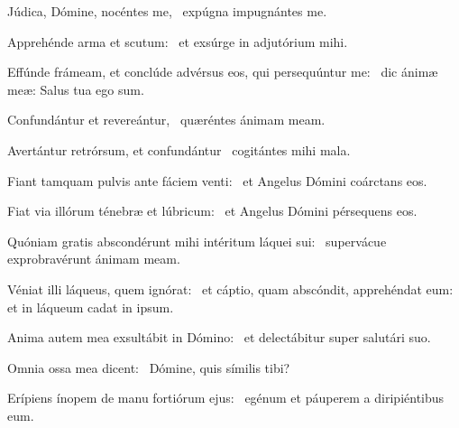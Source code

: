 \item Júdica, Dómine, nocéntes me,~\psstar{} expúgna impugnántes me.

\item Apprehénde arma et scutum:~\psstar{} et exsúrge in adjutórium mihi.

\item Effúnde frámeam, et conclúde advérsus eos, qui persequúntur me:~\psstar{} dic ánimæ meæ: Salus tua ego sum.

\item Confundántur et revereántur,~\psstar{} quæréntes ánimam meam.

\item Avertántur retrórsum, et confundántur~\psstar{} cogitántes mihi mala.

\item Fiant tamquam pulvis ante fáciem venti:~\psstar{} et Angelus Dómini coárctans eos.

\item Fiat via illórum ténebræ et lúbricum:~\psstar{} et Angelus Dómini pérsequens eos.

\item Quóniam gratis abscondérunt mihi intéritum láquei sui:~\psstar{} supervácue exprobravérunt ánimam meam.

\item Véniat illi láqueus, quem ignórat:~\pscross{} et cáptio, quam abscóndit, apprehéndat eum:~\psstar{} et in láqueum cadat in ipsum.

\item Anima autem mea exsultábit in Dómino:~\psstar{} et delectábitur super salutári suo.

\item Omnia ossa mea dicent:~\psstar{} Dómine, quis símilis tibi?

\item Erípiens ínopem de manu fortiórum ejus:~\psstar{} egénum et páuperem a diripiéntibus eum.
